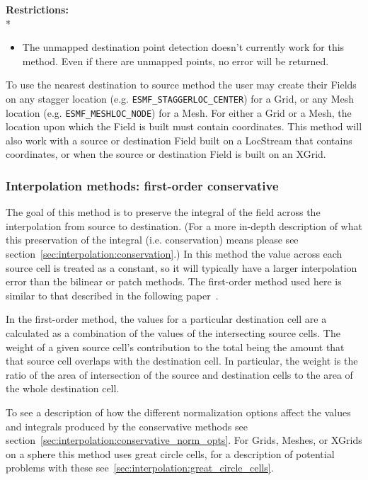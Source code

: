 \smallskip

\textbf{Restrictions:}\\*
\begin{itemize}
\item The unmapped destination point detection doesn't currently work for this method. Even if there are unmapped points, no error will be returned. 
\end{itemize}

\smallskip

 To use the nearest destination to source method the user may create their Fields on any stagger location (e.g. {\tt ESMF\_STAGGERLOC\_CENTER}) for a Grid, or
 any Mesh location (e.g. {\tt ESMF\_MESHLOC\_NODE}) for a Mesh. For either a Grid or a Mesh, the location upon which the Field is built 
 must contain coordinates. This method will also work with a source or destination Field built on a LocStream that contains coordinates, or when the source 
or destination Field is built on an XGrid.

\subsubsection{Interpolation methods: first-order conservative}\label{sec:interpolation:conserve}
 The goal of this method is to preserve the integral of the field across the interpolation from source to destination.  
 (For a more in-depth description of what this preservation of the integral (i.e. conservation) means please see section~\ref{sec:interpolation:conservation}.)  In this method the value across each source cell is treated as a constant, so it will typically have a larger 
 interpolation error than the bilinear or patch methods.  The first-order method used here is similar to that described in the following paper~\cite{ConservativeOrder1}.

 In the first-order method, the values for a particular destination cell are a calculated as a combination of the values of the intersecting 
 source cells. The weight of a given source cell's contribution 
 to the total being the amount that that source cell overlaps with the destination cell. 
 In particular, the weight is the ratio of the area of intersection of the source and destination cells to the area of the whole destination cell. 

 To see a description of how the different normalization options affect the values and integrals produced by the conservative methods see section~\ref{sec:interpolation:conservative_norm_opts}. For Grids, Meshes, or XGrids on a sphere this method uses great circle cells, for a description of potential problems with these see~\ref{sec:interpolation:great_circle_cells}.

